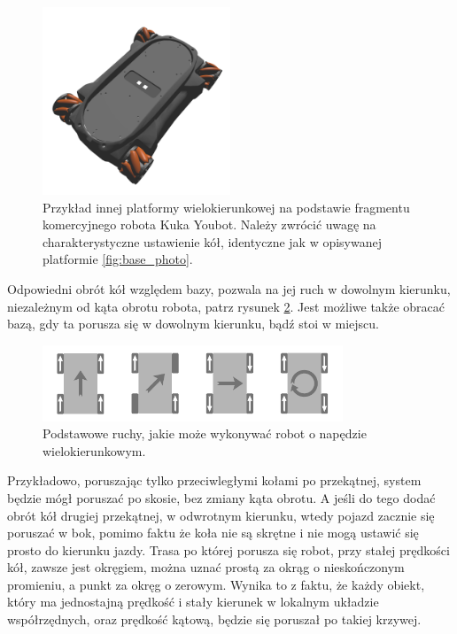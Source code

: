 	\begin{figure}[H]
	\centering
	\includegraphics[width=0.5\textwidth]{graphics/kuka_youbot.png}
	\caption{Przykład innej platformy wielokierunkowej na podstawie fragmentu komercyjnego robota Kuka Youbot. 
	Należy zwrócić uwagę na charakterystyczne ustawienie kół, identyczne jak w opisywanej platformie \ref{fig:base_photo}.}
	\label{fig:kuka_youbot}
	\end{figure} 

	Odpowiedni obrót kół względem bazy, pozwala na jej ruch w dowolnym kierunku, niezależnym od kąta obrotu robota, patrz rysunek \ref{fig:mecanum_dirs}.
	Jest możliwe także obracać bazą, gdy ta porusza się w dowolnym kierunku, bądź stoi w miejscu.
	
	\begin{figure}[H]
	\centering
	\includegraphics[width=0.8\textwidth]{graphics/mecanum_dirs.pdf}
	\caption{Podstawowe ruchy, jakie może wykonywać robot o napędzie wielokierunkowym.}
	\label{fig:mecanum_dirs}
	\end{figure} 
	
	Przykładowo, poruszając tylko przeciwległymi kołami po przekątnej, system będzie mógł poruszać po skosie, bez zmiany kąta obrotu.
	A jeśli do tego dodać obrót kół drugiej przekątnej, w odwrotnym kierunku, wtedy pojazd zacznie się poruszać w bok, pomimo faktu że koła nie są skrętne i 
	nie mogą ustawić się prosto do kierunku jazdy.
	Trasa po której porusza się robot, przy stałej prędkości kół, zawsze jest okręgiem, można uznać prostą za okrąg o nieskończonym promieniu, a punkt za okręg o zerowym.
	Wynika to z faktu, że każdy obiekt, który ma jednostajną prędkość i stały kierunek w lokalnym układzie współrzędnych, oraz prędkość kątową, będzie się poruszał po takiej krzywej.

